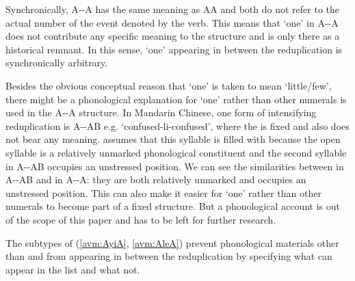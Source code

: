 {Synchronically, A--A has the same meaning as AA and both do not refer to the actual number of the event denoted by the verb.
This means that  `one' in A--A does not contribute any specific meaning to the structure
and is only there as a historical remnant.
In this sense,   `one' appearing in between the reduplication is synchronically arbitrary. %

Besides the obvious conceptual reason that   `one' is taken to mean `little/few',
there might be a phonological explanation for   `one' rather than other numerals is used in the A--A structure.
In Mandarin Chinese, one form of intensifying reduplication is A--AB e.g.  `confused-li-confused',
where the  is fixed and also does not bear any meaning.
\citet[137]{Sui2018} assumes that this syllable is filled with  because the open syllable  is a relatively unmarked phonological constituent \citep{Yip1992}
and the second syllable in A--AB occupies an unstressed position.
We can see the similarities between  in A--AB and  in A--A: they are both relatively unmarked and occupies an unstressed position.
This can also make it easier for   `one' rather than other numerals to become part of a fixed structure.
But a phonological account is out of the scope of this paper and has to be left for further research.

The subtypes of  (\ref{avm:AyiA}, \ref{avm:AleA}) prevent phonological materials other than  and  from appearing in between the reduplication by specifying what can appear in the \etag list and what not.
}


\ea\label{avm:AleA}
\ea    %
         \impl\\
\ex   %
\label{avm:a-le-a-lr}
     \impl\\
\z
\z

